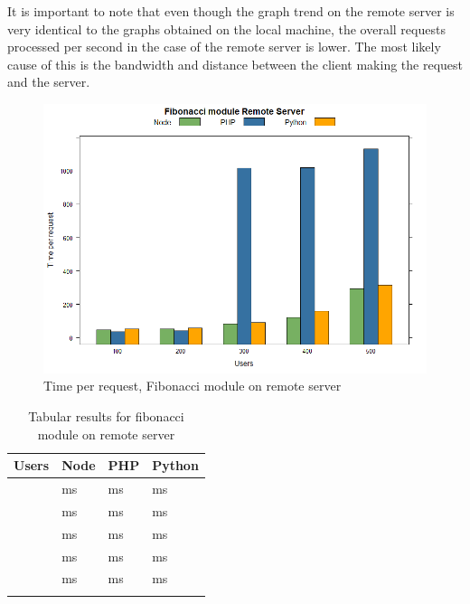 \documentclass[../thesis.tex]{subfiles}
\begin{document}
It is important to note that even though the graph trend on the remote server is very identical to the graphs obtained on the local machine, the overall requests processed per second in the case of the remote server is lower. The most likely cause of this is the bandwidth and distance between the client making the request and the server.
\newpage
	\begin{figure}[H]
	\centering
	\includegraphics[width=1\textwidth]{../images/fibRemotetpr.png}
	\caption{Time per request, Fibonacci module on remote server}
	\label{rys1}
\end{figure}
\begin{table}[H]
	\caption{Tabular results for fibonacci module on remote server}
	\centering
	\footnotesize
	\label{tab1}
	\bigskip
	\begin{tabular}{!{\color{sapphire}\vrule width 1pt}m{0.22\textwidth}!{\color{black}\vrule width 1pt}m{0.22\textwidth}!{\color{black}\vrule width 1pt}m{0.22\textwidth}!{\color{black}\vrule width 1pt}m{0.22\textwidth}!{\color{sapphire}\vrule width 1pt}}
		\hline
		\Centering \textbf{Users} &
		\Centering \textbf{Node} &
		\Centering \textbf{PHP} &
		\Centering \textbf{Python} \\
		\hline
		 &
		 ms &
		 ms&
		 ms\\
		\hline
		 &
		 ms&
		 ms&
		 ms\\
		\hline
		 &
		 ms&
		 ms&
		 ms\\
		\hline
		 &
		 ms&
		 ms&
		 ms\\
		\hline
		 &
		 ms&
		 ms&
		 ms\\
		\hline
		\hline
	\end{tabular}
\end{table}
\end{document}
